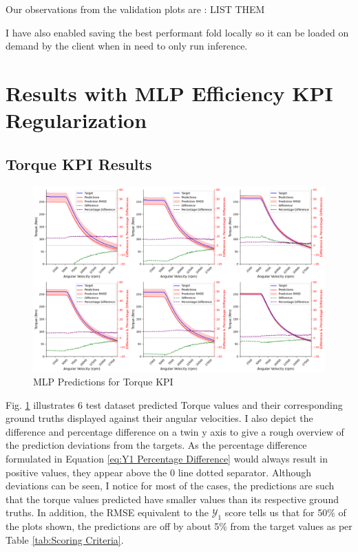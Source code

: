 \documentclass{report} %
\begin{document}
Our observations from the validation plots are : LIST THEM

I have also enabled saving the best performant fold locally so it can be loaded on demand by the client when in need to only run inference.\\

\section{Results with MLP Efficiency KPI Regularization}\label{sec:Results with MLP Efficiency KPI Regularization}
\subsection{Torque KPI Results}\label{subsec:Torque KPI Results with MLP Efficiency KPI Regularization}

\begin{figure}[H]
    \centering
    \includegraphics[width=1\textwidth]{./ReportImages/KPI2D_predictions.png} 
    \caption{MLP Predictions for Torque \ac{KPI}} 
    \label{fig:MLP Training Results for 2D KPI(Torque)}
\end{figure}

Fig. \ref{fig:MLP Training Results for 2D KPI(Torque)} illustrates 6 test dataset predicted Torque values and their corresponding ground truths displayed against their 
angular velocities. I also depict the difference and percentage difference on a twin y axis to give a rough overview of the prediction deviations from the targets.
As the percentage difference formulated in Equation \ref{eq:Y1 Percentage Difference} would always result in positive values, they appear above the 0 line dotted separator.
Although deviations can be seen, I notice for most of the cases, the predictions are such that the torque values predicted have smaller values than its respective ground truths.
In addition, the \ac{RMSE} equivalent to the $\mathcal{Y}_1$ score tells us that for 50\% of the plots shown, the predictions are off by about 5\% from the target values as per 
Table \ref{tab:Scoring Criteria}.
\end{document}
